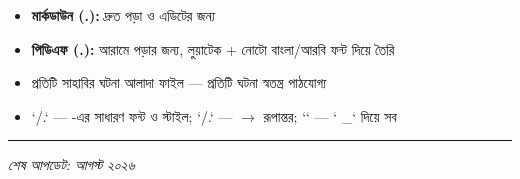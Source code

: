 \begin{itemize}
\item \textbf{মার্কডাউন (.):} দ্রুত পড়া ও এডিটের জন্য
\item \textbf{পিডিএফ (.):} আরামে পড়ার জন্য, লুয়াটেক + নোটো বাংলা/আরবি ফন্ট দিয়ে তৈরি
\item প্রতিটি সাহাবির ঘটনা আলাদা ফাইল — প্রতিটি ঘটনা স্বতন্ত্র পাঠযোগ্য
\item `/.` — -এর সাধারণ ফন্ট ও স্টাইল; `/.` —  $\rightarrow$  রূপান্তর; `` — ` \_` দিয়ে সব 
\end{itemize}
\medskip\hrule\medskip

\textit{শেষ আপডেট: আগস্ট ২০২৬}



